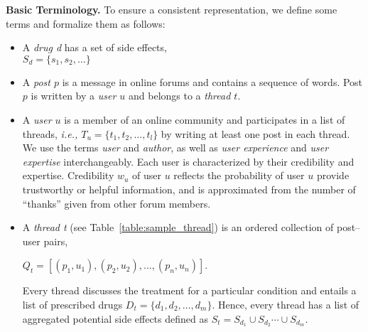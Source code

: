\documentclass{bmcart}
\begin{document}
{\bf Basic Terminology.} To ensure a consistent representation, 
we define some terms and formalize them as follows:

\begin{itemize}
\item A \textit{drug d} has a set of side effects, \\
  $S_d = \{s_1, s_2, \ldots\}$
\item A \textit{post $p$} is a message in online forums and contains a sequence of words. Post $p$ is written by a \textit{user $u$} and belongs to a \textit{thread $t$}.
\item A \textit{user $u$} is a member of an online community and participates in a list of threads, \textit{ i.e., $T_u = \{t_1, t_2, \ldots, t_l\}$} by writing at least one post in each thread.
We use the terms \textit{user} and \textit{author}, as well as \textit{user experience} and \textit{user expertise} interchangeably.
\noindent
Each user is characterized by their credibility and expertise. Credibility $w_u$ of user $u$ reflects the probability of user $u$ provide trustworthy or helpful information, and is approximated from the number of ``thanks'' given from other forum members.

\item A \textit{thread t}
(see Table~\ref{table:sample_thread}) 
is an ordered collection of post--user pairs, 

$Q_t = [\left(p_1, u_1\right), \left(p_2, u_2\right), \ldots, \left(p_n, u_n\right)]$. 

\noindent
Every thread discusses the treatment for a particular condition and entails a list of prescribed drugs 
$D_t=\{d_1, d_2, \ldots, d_m\}$. 
Hence, every thread has a list of aggregated potential side effects defined as $S_t = S_{d_1} \cup S_{d_2} \cdots \cup S_{d_m}$. \\

\end{itemize}
\end{document}
